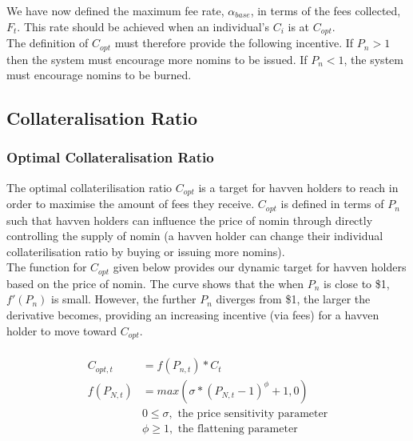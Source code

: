 \noindent We have now defined the maximum fee rate, $\alpha_{base}$, in terms of the fees collected, $F_t$. This rate should be achieved when an individual's $C_i$ is at $C_{opt}$. \\

\noindent The definition of $C_{opt}$ must therefore provide the following incentive. If $P_n > 1$ then the system must encourage more nomins to be issued. If $P_n < 1$, the system must encourage nomins to be burned. 

\newpage

\subsection{Collateralisation Ratio}
\subsubsection{Optimal Collateralisation Ratio}

\noindent The optimal collaterilisation ratio $C_{opt}$ is a target for havven holders to reach in order to maximise the amount of fees they receive. $C_{opt}$ is defined in terms of $P_n$ such that havven holders can influence the price of nomin through directly controlling the supply of nomin (a havven holder can change their individual collaterilisation ratio by buying or issuing more nomins). \\
 
\noindent The function for $C_{opt}$ given below provides our dynamic target for havven holders based on the price of nomin. The curve shows that the when $P_n$ is close to \$1, $ f'(P_n) $ is small. However, the further $P_n$ diverges from \$1, the larger the derivative becomes, providing an increasing incentive (via fees) for a havven holder to move toward $C_{opt}$.

\begin{gather} 
\begin{align}
\begin{split}
C_{opt,t} &= f(P_{n,t}) * C_t  \\ 
f(P_{N,t}) &= max(\sigma * (P_{N,t} - 1)^{\phi} + 1, 0) \\
& 0 \leq \sigma, \text{ the price sensitivity parameter} \\
& \phi \geq 1, \text{ the flattening parameter} \\
\end{split}
\end{align}
\end{gather}


